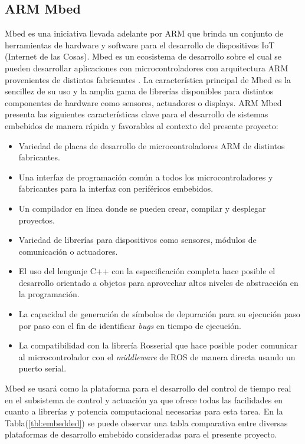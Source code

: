     \subsection{ARM Mbed}
    Mbed es una iniciativa llevada adelante por ARM que brinda un conjunto de herramientas de hardware y software para el 
    desarrollo de dispositivos IoT (Internet de las Cosas). Mbed es un ecosistema de desarrollo sobre el cual se pueden 
    desarrollar aplicaciones con microcontroladores con arquitectura ARM provenientes de distintos fabricantes \cite{mbed}. La 
    característica principal de Mbed es la sencillez de su uso y la amplia gama de librerías disponibles para distintos componentes 
    de hardware como sensores, actuadores o displays. ARM Mbed presenta las siguientes características clave para el desarrollo 
    de sistemas embebidos de manera rápida y favorables al contexto del presente proyecto:

    \begin{itemize}
        \item Variedad de placas de desarrollo de microcontroladores ARM de distintos fabricantes.
        \item Una interfaz de programación común a todos los microcontroladores y fabricantes para la interfaz con 
        periféricos embebidos.
        \item Un compilador en línea donde se pueden crear, compilar y desplegar proyectos.
        \item Variedad de librerías para dispositivos como sensores, módulos de comunicación o actuadores.
        \item El uso del lenguaje C++ con la especificación completa hace posible el desarrollo orientado 
        a objetos para aprovechar altos niveles de abstracción en la programación.
        \item La capacidad de generación de símbolos de depuración para su ejecución paso por paso con el fin de 
        identificar \textit{bugs} en tiempo de ejecución.
        \item La compatibilidad con la librería Rosserial que hace posible poder comunicar al microcontrolador 
        con el \textit{middleware} de ROS de manera directa usando un puerto serial.
    \end{itemize}

    Mbed se usará como la plataforma para el desarrollo del control de tiempo real en el subsistema de control y actuación 
    ya que ofrece todas las facilidades en cuanto a librerías y potencia computacional necesarias para esta tarea. En la 
    Tabla(\ref{tbl:embedded}) se puede observar una tabla comparativa entre diversas plataformas de desarrollo embebido 
    consideradas para el presente proyecto.


